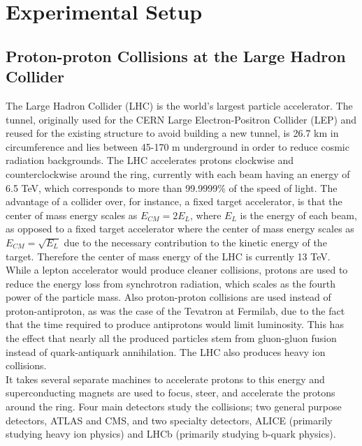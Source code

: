 \chapter{Experimental Setup}


\section{Proton-proton Collisions at the Large Hadron Collider}
The Large Hadron Collider (LHC) is the world's largest particle accelerator.  The tunnel, originally used for the CERN Large Electron-Positron Collider (LEP) and reused for the existing structure to avoid building a new tunnel, is 26.7 km in circumference and lies between 45-170 m underground in order to reduce cosmic radiation backgrounds.  The LHC accelerates protons clockwise and counterclockwise around the ring, currently with each beam having an energy of 6.5 TeV, which corresponds to more than 99.9999\% of the speed of light.  The advantage of a collider over, for instance, a fixed target accelerator, is that the center of mass energy scales as $E_{CM} = 2E_{L}$, where $E_{L}$ is the energy of each beam, as opposed to a fixed target accelerator where the center of mass energy scales as $E_{CM}=\sqrt{E_{L}}$ due to the necessary contribution to the kinetic energy of the target.  Therefore the center of mass energy of the LHC is currently 13 TeV.\\

While a lepton accelerator would produce cleaner collisions, protons are used to reduce the energy loss from synchrotron radiation, which scales as the fourth power of the particle mass.  Also proton-proton collisions are used instead of proton-antiproton, as was the case of the Tevatron at Fermilab, due to the fact that the time required to produce antiprotons would limit luminosity.  This has the effect that nearly all the produced particles stem from gluon-gluon fusion instead of quark-antiquark annihilation.  The LHC also produces heavy ion collisions.\\

It takes several separate machines to accelerate protons to this energy and superconducting magnets are used to focus, steer, and accelerate the protons around the ring.  Four main detectors study the collisions; two general purpose detectors, ATLAS and CMS, and two specialty detectors, ALICE (primarily studying heavy ion physics) and LHCb (primarily studying b-quark physics). \\%



